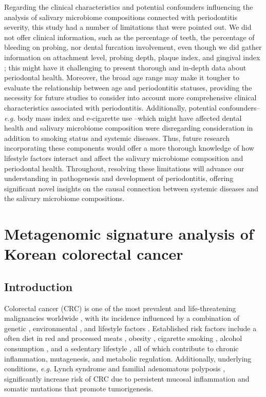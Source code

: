 \documentclass[11pt, a4paper, onecolumn, oneside]{report}
\begin{document}
            Regarding the clinical characteristics and potential confounders influencing the analysis of salivary microbiome compositions connected with periodontitis severity, this study had a number of limitations that were pointed out. We did not offer clinical information, such as the percentage of teeth, the percentage of bleeding on probing, nor dental furcation involvement, even though we did gather information on attachment level, probing depth, plaque index, and gingival index \cite{Periodontitis-diagnosis-9}; this might have it challenging to present thorough and in-depth data about periodontal health. Moreover, the broad age range may make it tougher to evaluate the relationship between age and periodontitis statuses, providing the necessity for future studies to consider into account more comprehensive clinical characteristics associated with periodontitis. Additionally, potential confounders--\textit{e.g.} body mass index \cite{obesity-1} and e-cigarette use \cite{cigarette-1}--which might have affected dental health and salivary microbiome composition were disregarding consideration in addition to smoking status and systemic diseases. Thus, future research incorporating these components would offer a more thorough knowledge of how lifestyle factors interact and affect the salivary microbiome composition and periodontal health. Throughout, resolving these limitations will advance our understanding in pathogenesis and development of periodontitis, offering significant novel insights on the causal connection between systemic diseases and the salivary microbiome compositions.
        \newpage

    \section{Metagenomic signature analysis of Korean colorectal cancer}
        \label{section:CRC}
        \subsection{Introduction}
            Colorectal cancer (CRC) is one of the most prevalent and life-threatening malignancies worldwide \cite{CRC-1, CRC-2, CRC-3}, with its incidence influenced by a combination of genetic \cite{CRC-factor-1, CRC-factor-2}, environmental \cite{CRC-factor-3, CRC-factor-4}, and lifestyle factors \cite{CRC-factor-5, CRC-factor-6, CRC-factor-7, CRC-factor-8}. Established risk factors include a often diet in red and processed meats \cite{CRC-factor-9, CRC-factor-10}, obesity \cite{CRC-factor-11, CRC-factor-12}, cigarette smoking \cite{CRC-factor-5, CRC-factor-6}, alcohol consumption \cite{CRC-factor-7, CRC-factor-8}, and a sedentary lifestyle \cite{CRC-factor-13}, all of which contribute to chronic inflammation, mutagenesis, and metabolic regulation. Additionally, underlying conditions, \textit{e.g.} Lynch syndrome \cite{CRC-disease-3, CRC-disease-4} and familial adenomatous polyposis \cite{CRC-disease-1, CRC-disease-2}, significantly increase risk of CRC due to persistent mucosal inflammation and somatic mutations that promote tumorigenesis.
\end{document}
